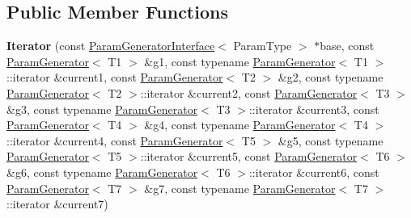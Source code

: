 \subsection*{Public Member Functions}
\begin{DoxyCompactItemize}
\item 
\mbox{\label{classtesting_1_1internal_1_1_cartesian_product_generator7_1_1_iterator_a33fb48c1470544760cdd3cbf52b97af7}} 
{\bfseries Iterator} (const \mbox{\hyperlink{classtesting_1_1internal_1_1_param_generator_interface}{Param\+Generator\+Interface}}$<$ Param\+Type $>$ $\ast$base, const \mbox{\hyperlink{classtesting_1_1internal_1_1_param_generator}{Param\+Generator}}$<$ T1 $>$ \&g1, const typename \mbox{\hyperlink{classtesting_1_1internal_1_1_param_generator}{Param\+Generator}}$<$ T1 $>$\+::iterator \&current1, const \mbox{\hyperlink{classtesting_1_1internal_1_1_param_generator}{Param\+Generator}}$<$ T2 $>$ \&g2, const typename \mbox{\hyperlink{classtesting_1_1internal_1_1_param_generator}{Param\+Generator}}$<$ T2 $>$\+::iterator \&current2, const \mbox{\hyperlink{classtesting_1_1internal_1_1_param_generator}{Param\+Generator}}$<$ T3 $>$ \&g3, const typename \mbox{\hyperlink{classtesting_1_1internal_1_1_param_generator}{Param\+Generator}}$<$ T3 $>$\+::iterator \&current3, const \mbox{\hyperlink{classtesting_1_1internal_1_1_param_generator}{Param\+Generator}}$<$ T4 $>$ \&g4, const typename \mbox{\hyperlink{classtesting_1_1internal_1_1_param_generator}{Param\+Generator}}$<$ T4 $>$\+::iterator \&current4, const \mbox{\hyperlink{classtesting_1_1internal_1_1_param_generator}{Param\+Generator}}$<$ T5 $>$ \&g5, const typename \mbox{\hyperlink{classtesting_1_1internal_1_1_param_generator}{Param\+Generator}}$<$ T5 $>$\+::iterator \&current5, const \mbox{\hyperlink{classtesting_1_1internal_1_1_param_generator}{Param\+Generator}}$<$ T6 $>$ \&g6, const typename \mbox{\hyperlink{classtesting_1_1internal_1_1_param_generator}{Param\+Generator}}$<$ T6 $>$\+::iterator \&current6, const \mbox{\hyperlink{classtesting_1_1internal_1_1_param_generator}{Param\+Generator}}$<$ T7 $>$ \&g7, const typename \mbox{\hyperlink{classtesting_1_1internal_1_1_param_generator}{Param\+Generator}}$<$ T7 $>$\+::iterator \&current7)
\item 
\mbox{\label{classtesting_1_1internal_1_1_cartesian_product_generator7_1_1_iterator_a04d2e1a894219d01a09ab51c9a18baa6}} 

\end{DoxyCompactItemize}
